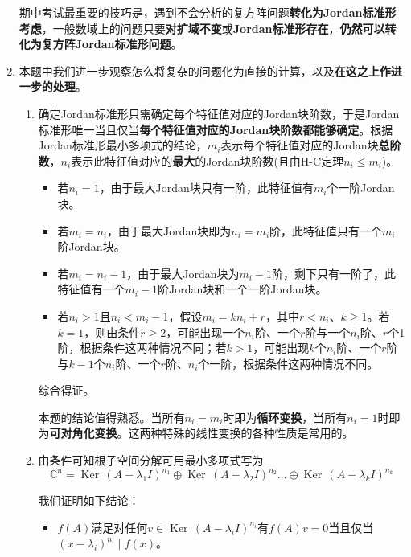 \documentclass[a4paper,UTF8,fontset=windows,AutoFakeBold]{ctexart}
\DeclareMathOperator{\Ker}{Ker\,}
\newcommand*{\note}{\noindent *}
\begin{document}
\begin{enumerate}
    \note 期中考试最重要的技巧是，遇到不会分析的复方阵问题\textbf{转化为Jordan标准形考虑}，一般数域上的问题只要\textbf{对扩域不变}或\textbf{Jordan标准形存在}，\textbf{仍然可以转化为复方阵Jordan标准形问题}。

    \item 本题中我们进一步观察怎么将复杂的问题化为直接的计算，以及\textbf{在这之上作进一步的处理}。
    \begin{enumerate}
        \item 确定Jordan标准形只需确定每个特征值对应的Jordan块阶数，于是Jordan标准形唯一当且仅当\textbf{每个特征值对应的Jordan块阶数都能够确定}。根据Jordan标准形最小多项式的结论，$m_i$表示每个特征值对应的Jordan块\textbf{总阶数}，$n_i$表示此特征值对应的\textbf{最大}的Jordan块阶数(且由H-C定理$n_i\le m_i$)。
        
        \begin{itemize}
            \item 若$n_i=1$，由于最大Jordan块只有一阶，此特征值有$m_i$个一阶Jordan块。
            \item 若$m_i=n_i$，由于最大Jordan块即为$n_i=m_i$阶，此特征值只有一个$m_i$阶Jordan块。
            \item 若$m_i=n_i-1$，由于最大Jordan块为$m_i-1$阶，剩下只有一阶了，此特征值有一个$m_i-1$阶Jordan块和一个一阶Jordan块。
            \item 若$n_i>1$且$n_i<m_i-1$，假设$m_i=kn_i+r$，其中$r<n_i$、$k\ge1$。若$k=1$，则由条件$r\ge2$，可能出现一个$n_i$阶、一个$r$阶与一个$n_i$阶、$r$个1阶，根据条件这两种情况不同；若$k>1$，可能出现$k$个$n_i$阶、一个$r$阶与$k-1$个$n_i$阶、一个$r$阶、$n_i$个一阶，根据条件这两种情况不同。
        \end{itemize}
        综合得证。

        \note 本题的结论值得熟悉。当所有$n_i=m_i$时即为\textbf{循环变换}，当所有$n_i=1$时即为\textbf{可对角化变换}。这两种特殊的线性变换的各种性质是常用的。

        \item 由条件可知根子空间分解可用最小多项式写为
        $$\mathbb{C}^n=\Ker(A-\lambda_1I)^{n_1}\oplus\Ker(A-\lambda_2I)^{n_2}\dots\oplus\Ker(A-\lambda_kI)^{n_k}$$

        我们证明如下结论：
        \begin{itemize}
            \item $f(A)$满足对任何$v\in\Ker(A-\lambda_iI)^{n_i}$有$f(A)v=0$当且仅当$(x-\lambda_i)^{n_i}\mid f(x)$。
            

\end{itemize}
\end{enumerate}
\end{enumerate}
\end{document}
